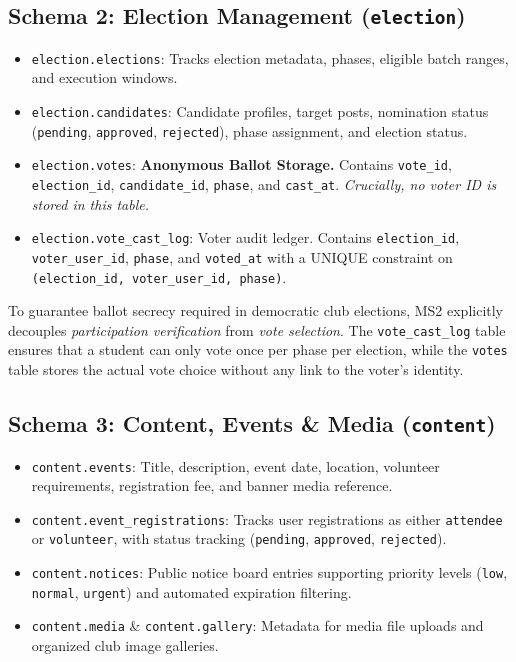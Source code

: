 \documentclass[12pt, a4paper]{report}
\begin{document}
\subsection{Schema 2: Election Management (\texttt{election})}
\begin{itemize}
    \item \texttt{election.elections}: Tracks election metadata, phases, eligible batch ranges, and execution windows.
    \item \texttt{election.candidates}: Candidate profiles, target posts, nomination status (\texttt{pending}, \texttt{approved}, \texttt{rejected}), phase assignment, and election status.
    \item \texttt{election.votes}: \textbf{Anonymous Ballot Storage.} Contains \texttt{vote\_id}, \texttt{election\_id}, \texttt{candidate\_id}, \texttt{phase}, and \texttt{cast\_at}. \textit{Crucially, no voter ID is stored in this table.}
    \item \texttt{election.vote\_cast\_log}: Voter audit ledger. Contains \texttt{election\_id}, \texttt{voter\_user\_id}, \texttt{phase}, and \texttt{voted\_at} with a UNIQUE constraint on \texttt{(election\_id, voter\_user\_id, phase)}.
\end{itemize}

\begin{tcolorbox}[colback=codebg,colframe=highlightgold,title=\textbf{Architectural Highlight: Ballot Privacy Protection}]
To guarantee ballot secrecy required in democratic club elections, MS2 explicitly decouples \textit{participation verification} from \textit{vote selection}. The \texttt{vote\_cast\_log} table ensures that a student can only vote once per phase per election, while the \texttt{votes} table stores the actual vote choice without any link to the voter's identity.
\end{tcolorbox}

\subsection{Schema 3: Content, Events \& Media (\texttt{content})}
\begin{itemize}
    \item \texttt{content.events}: Title, description, event date, location, volunteer requirements, registration fee, and banner media reference.
    \item \texttt{content.event\_registrations}: Tracks user registrations as either \texttt{attendee} or \texttt{volunteer}, with status tracking (\texttt{pending}, \texttt{approved}, \texttt{rejected}).
    \item \texttt{content.notices}: Public notice board entries supporting priority levels (\texttt{low}, \texttt{normal}, \texttt{urgent}) and automated expiration filtering.
    \item \texttt{content.media} \& \texttt{content.gallery}: Metadata for media file uploads and organized club image galleries.
\end{itemize}
\end{document}
